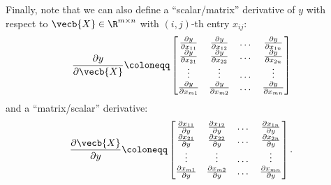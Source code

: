 Finally, note that we can also define a ``scalar/matrix'' derivative of $y$ with respect to $\vecb{X} \in \R^{m \times n}$ with $(i, j)$-th entry $x_{ij}$:
\begin{equation*}
	\frac{\partial y}{\partial \vecb{X}} \coloneqq
	\begin{bmatrix}
		\frac{\partial y}{\partial x_{11}} & \frac{\partial y}{\partial x_{12}} & \dots & \frac{\partial y}{\partial x_{1n}} \\
		\frac{\partial y}{\partial x_{21}} & \frac{\partial y}{\partial x_{22}} & \dots & \frac{\partial y}{\partial x_{2n}} \\
		\vdots                             & \vdots                             & \dots & \vdots                             \\
		\frac{\partial y}{\partial x_{m1}} & \frac{\partial y}{\partial x_{m2}} & \dots & \frac{\partial y}{\partial x_{mn}}
	\end{bmatrix}
\end{equation*}
and a ``matrix/scalar'' derivative:
\begin{equation*}
	\frac{\partial \vecb{X}}{\partial y} \coloneqq
	\begin{bmatrix}
		\frac{\partial x_{11}}{\partial y} & \frac{\partial x_{12}}{\partial y} & \dots & \frac{\partial x_{1n}}{\partial y} \\
		\frac{\partial x_{21}}{\partial y} & \frac{\partial x_{22}}{\partial y} & \dots & \frac{\partial x_{2n}}{\partial y} \\
		\vdots                             & \vdots                             & \dots & \vdots                             \\
		\frac{\partial x_{m1}}{\partial y} & \frac{\partial x_{m2}}{\partial y} & \dots & \frac{\partial x_{mn}}{\partial y}
	\end{bmatrix}.
\end{equation*}

